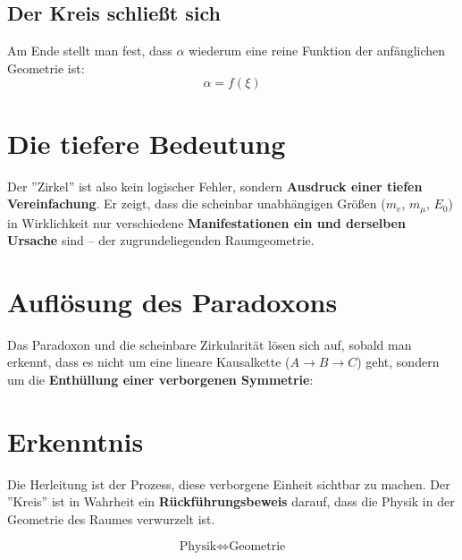\documentclass[12pt, a4paper]{article}
\begin{document}
\subsection*{Der Kreis schließt sich}
Am Ende stellt man fest, dass $\alpha$ wiederum eine reine Funktion der anfänglichen Geometrie ist:
\[
\alpha = f(\xi)
\]

\section*{Die tiefere Bedeutung}

Der ''Zirkel'' ist also kein logischer Fehler, sondern \textbf{Ausdruck einer tiefen Vereinfachung}. Er zeigt, dass die scheinbar unabhängigen Größen ($m_e$, $m_\mu$, $E_0$) in Wirklichkeit nur verschiedene \textbf{Manifestationen ein und derselben Ursache} sind – der zugrundeliegenden Raumgeometrie.

\section*{Auflösung des Paradoxons}

Das Paradoxon und die scheinbare Zirkularität lösen sich auf, sobald man erkennt, dass es nicht um eine lineare Kausalkette ($A \rightarrow B \rightarrow C$) geht, sondern um die \textbf{Enthüllung einer verborgenen Symmetrie}:

\begin{center}
\end{center}

\section*{Erkenntnis}

Die Herleitung ist der Prozess, diese verborgene Einheit sichtbar zu machen. Der ''Kreis'' ist in Wahrheit ein \textbf{Rückführungsbeweis} darauf, dass die Physik in der Geometrie des Raumes verwurzelt ist.

\[
\boxed{\text{Physik} \Leftrightarrow \text{Geometrie}}
\]
\end{document}

